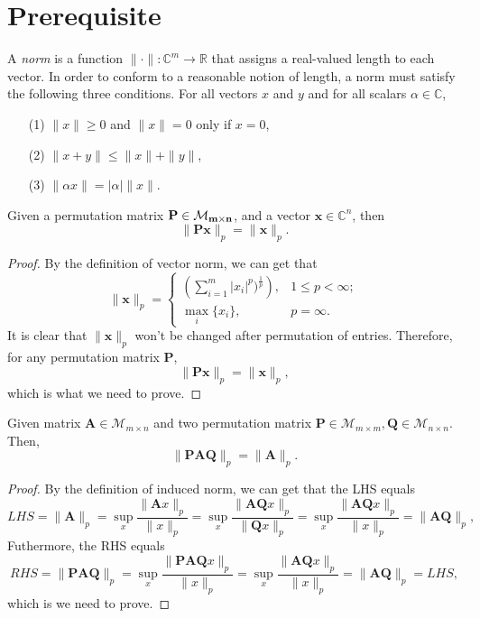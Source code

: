 \section{Prerequisite}
\begin{definition}
    A \textit{norm} is a function $\| \cdot \|: \mathbb{C}^{m} \to \mathbb{R}$ that assigns a real-valued length to each vector. In order to conform to a reasonable notion of length, a norm must 
    satisfy the following three conditions. For all vectors $x$ and $y$ and for all scalars $\alpha \in \mathbb{C}$,
    \begin{enumerate}
        \item[(1)] $\| x \| \geq 0$ and $\| x \| = 0$ only if $x = 0$,
        \item[(2)] $\| x + y\| \leq \| x\| + \| y\|$,
        \item[(3)] $\| \alpha x \| = |\alpha| \|x\|$.
    \end{enumerate}
\end{definition}
\begin{lemma}
Given a permutation matrix $\bf{P} \in \mathcal{M}_{m \times n}$, and a vector $\bm{x} \in \mathbb{C}^{n}$, then 
$$
    \|\bm{Px} \|_p = \|\bm{x} \|_p.
$$
\begin{proof} 
By the definition of vector norm, we can get that
$$
\|\bm{x}\|_p = \begin{cases}
\left(\sum_{i=1}^{m} |x_i|^{p})^{\frac{1}{p}}\right), & 1\leq p < \infty; \\
\max_{i} \{ x_i \}, & p = \infty .
\end{cases}
$$
It is clear that $\| \bm{x} \|_p$ won't be changed after permutation of entries. Therefore, for any permutation matrix $\bm{P}$,
$$
    \|\bm{Px} \|_p  = \|\bm{x} \|_p,
$$
which is what we need to prove.
\end{proof}
\end{lemma}

\begin{corollary}
Given matrix $\bm{A} \in \mathcal{M}_{m\times n} $ and two permutation matrix $\bm{P} \in \mathcal{M}_{m \times m}, \bm{Q} \in \mathcal{M}_{n \times n}$. Then,
$$
\| \bm{PAQ}\|_{p} = \|  \bm{A} \|_{p}.
$$
\end{corollary}

\begin{proof}
    By the definition of induced norm, we can get that the LHS equals
    $$
    LHS = \|\bm{A}\|_p = \sup_{x} \frac{\| \bm{A} x\|_p}{\|x\|_p} =  \sup_{x} \frac{\|\bm{AQ} x \|_p}{\|\bm{Q} x\|_p} = \sup_{x} \frac{\|\bm{AQ} x \|_p}{\|x\|_p} = \| \bm{AQ} \|_p,
    $$
    Futhermore, the RHS equals
    $$
    RHS = \| \bm{PAQ}\|_p = \sup_{x} \frac{\|\bm{PAQ} x\|_p}{\|x\|_p} = \sup_{x} \frac{\| \bm{AQ}x \|_p}{\|x \|_p} = \| \bm{AQ}\|_p = LHS,
    $$
    which is we need to prove.
\end{proof}



